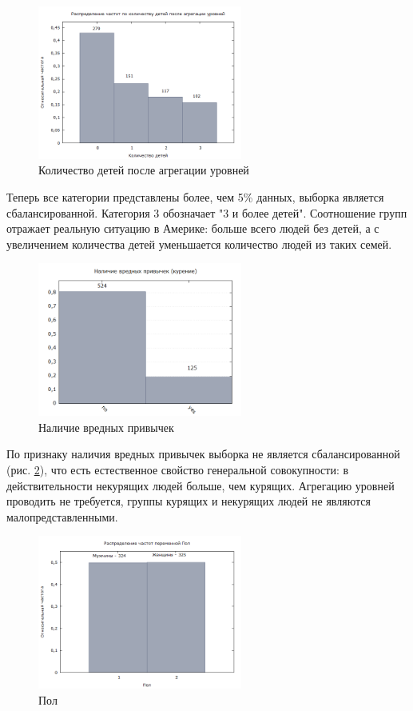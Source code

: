 \documentclass[a4paper,12pt]{article}
\begin{document}
\begin{figure}[H]
	\includegraphics[width=0.6\textwidth]{../[graphics]/children_agr.png}
	\centering
	\caption{Количество детей после агрегации уровней}
	\label{fig:children_agr}
\end{figure}

Теперь все категории представлены более, чем 5\% данных, выборка является сбалансированной. Категория 3 обозначает "3 и более детей". Соотношение групп отражает реальную ситуацию в Америке: больше всего людей без детей, а с увеличением количества детей уменьшается количество людей из таких семей.

\begin{figure}[H]
	\includegraphics[width=0.6\textwidth]{../[graphics]/smoker.png}
	\centering
	\caption{Наличие вредных привычек}
	\label{fig:smoker}
\end{figure}

По признаку наличия вредных привычек выборка не является сбалансированной (рис. \ref{fig:smoker}), что есть естественное свойство генеральной совокупности: в действительности некурящих людей больше, чем курящих. Агрегацию уровней проводить не требуется, группы курящих и некурящих людей не являются малопредставленными.

\begin{figure}[H]
	\includegraphics[width=0.6\textwidth]{../[graphics]/sex.png}
	\centering
	\caption{Пол}
	\label{fig:sex}
\end{figure}
\end{document}
